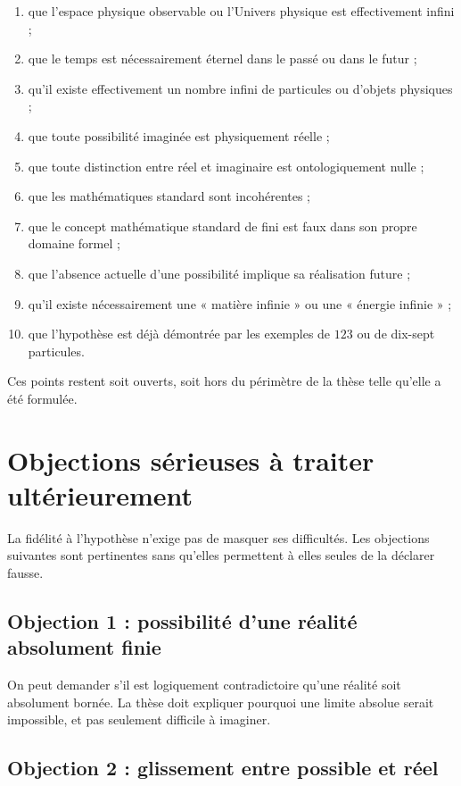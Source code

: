 \documentclass[11pt,a4paper]{article}
\begin{document}
\begin{enumerate}
    \item que l'espace physique observable ou l'Univers physique est effectivement infini ;
    \item que le temps est nécessairement éternel dans le passé ou dans le futur ;
    \item qu'il existe effectivement un nombre infini de particules ou d'objets physiques ;
    \item que toute possibilité imaginée est physiquement réelle ;
    \item que toute distinction entre réel et imaginaire est ontologiquement nulle ;
    \item que les mathématiques standard sont incohérentes ;
    \item que le concept mathématique standard de fini est faux dans son propre domaine formel ;
    \item que l'absence actuelle d'une possibilité implique sa réalisation future ;
    \item qu'il existe nécessairement une « matière infinie » ou une « énergie infinie » ;
    \item que l'hypothèse est déjà démontrée par les exemples de \(123\) ou de dix-sept particules.
\end{enumerate}

Ces points restent soit ouverts, soit hors du périmètre de la thèse telle qu'elle a été formulée.

\section{Objections sérieuses à traiter ultérieurement}

La fidélité à l'hypothèse n'exige pas de masquer ses difficultés. Les objections suivantes sont pertinentes sans qu'elles permettent à elles seules de la déclarer fausse.

\subsection{Objection 1 : possibilité d'une réalité absolument finie}

On peut demander s'il est logiquement contradictoire qu'une réalité soit absolument bornée. La thèse doit expliquer pourquoi une limite absolue serait impossible, et pas seulement difficile à imaginer.

\subsection{Objection 2 : glissement entre possible et réel}
\end{document}
